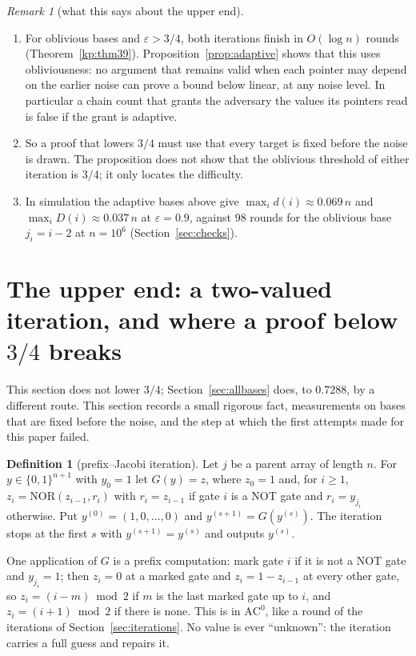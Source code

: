 \documentclass[11pt]{amsart}
\theoremstyle{definition}
\newtheorem{definition}[theorem]{Definition}
\theoremstyle{remark}
\newtheorem{remark}[theorem]{Remark}
\newcommand{\eps}{\varepsilon}
\newcommand{\NOR}{\mathrm{NOR}}
\begin{document}
\begin{remark}[what this says about the upper end]\label{rem:upper}
\begin{enumerate}[label=(\roman*),leftmargin=2.4em]
\item For oblivious bases and $\eps>3/4$, both iterations finish in $O(\log n)$ rounds (Theorem~\ref{kp:thm39}).
Proposition~\ref{prop:adaptive} shows that this uses obliviousness: no argument that remains valid
when each pointer may depend on the earlier noise can prove a bound below linear, at any noise
level. In particular a chain count that grants the adversary the values its pointers read is false if
the grant is adaptive.
\item So a proof that lowers $3/4$ must use that every target is fixed before the noise is drawn.
The proposition does not show that the oblivious threshold of either iteration is $3/4$; it only
locates the difficulty.
\item In simulation the adaptive bases above give $\max_id(i)\approx0.069\,n$ and
$\max_iD(i)\approx0.037\,n$ at $\eps=0.9$, against $98$ rounds for the oblivious base $j_i=i-2$ at
$n=10^6$ (Section~\ref{sec:checks}).
\end{enumerate}
\end{remark}

\section{The upper end: a two-valued iteration, and where a proof below \texorpdfstring{$3/4$}{3/4} breaks}\label{sec:upper}

This section does not lower $3/4$; Section~\ref{sec:allbases} does, to $0.7288$, by a different
route. This section records a small rigorous fact, measurements on bases that are fixed before the
noise, and the step at which the first attempts made for this paper failed.

\begin{definition}[prefix--Jacobi iteration]\label{def:jacobi}
Let $j$ be a parent array of length $n$. For $y\in\{0,1\}^{n+1}$ with $y_0=1$ let $G(y)=z$, where
$z_0=1$ and, for $i\ge1$, $z_i=\NOR(z_{i-1},r_i)$ with $r_i=z_{i-1}$ if gate $i$ is a NOT gate and
$r_i=y_{j_i}$ otherwise. Put $y^{(0)}=(1,0,\dots,0)$ and $y^{(s+1)}=G(y^{(s)})$. The iteration
stops at the first $s$ with $y^{(s+1)}=y^{(s)}$ and outputs $y^{(s)}$.
\end{definition}

One application of $G$ is a prefix computation: mark gate $i$ if it is not a NOT gate and
$y_{j_i}=1$; then $z_i=0$ at a marked gate and $z_i=1-z_{i-1}$ at every other gate, so
$z_i=(i-m)\bmod 2$ if $m$ is the last marked gate up to $i$, and $z_i=(i+1)\bmod2$ if there is
none. This is in $\mathrm{AC}^0$, like a round of the iterations of Section~\ref{sec:iterations}. No value is ever
``unknown'': the iteration carries a full guess and repairs it.
\end{document}
